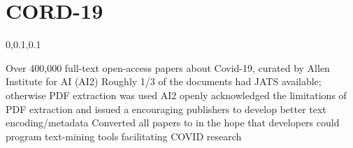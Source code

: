 
\section{CORD-19}\fbeg{}\begin{frame}{}

\vspace{-.5em}	

{\Large{}\selectfont

\hspace*{20pt}\begin{minipage}{.96\textwidth}
\vspace{4pt}
		
\begin{lightquadblockc}{0,0.1,0.1}{\parbox{21cm}{\centering \vspace{3pt}}}
\begin{center}\begin{minipage}{1.1\textwidth}
{\Huge \setlength{\leftmargini}{30pt}\begin{enumerate}
\dmitem {\dsp} Over 400,000 full-text open-access papers about Covid-19, curated by Allen Institute for AI (AI2) 
\vspace{20pt}
\dmitem {\dsp} Roughly 1/3 of the documents had JATS available; otherwise PDF extraction was used
\vspace{20pt}
\dmitem {\dsp} AI2 openly acknowledged the limitations of PDF extraction and issued a 
 encouraging publishers to develop better text encoding/metadata 
\vspace{20pt}
\dmitem {\dsp} Converted all papers to \resizebox{!}{17pt}{\textcolor{bkorange}{S2ORC-JSON}} in the hope that developers could 
program text-mining tools facilitating COVID research
\vspace{20pt}
\end{enumerate}
}\end{minipage}
\end{center}
\end{lightquadblockc}
\end{minipage}

}

\end{frame}

